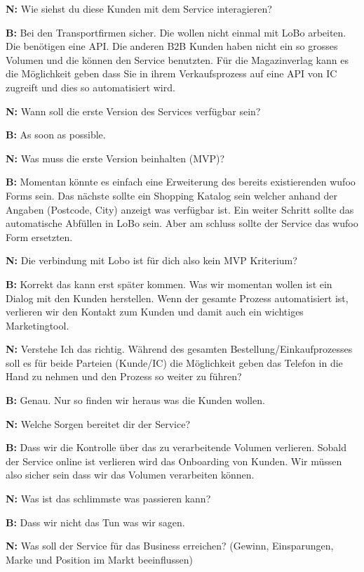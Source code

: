\textbf{N:} Wie siehst du diese Kunden mit dem Service interagieren?

\textbf{B:} Bei den Transportfirmen sicher. Die wollen nicht einmal mit LoBo arbeiten. Die benötigen eine API. Die anderen B2B Kunden haben nicht ein so grosses Volumen und die können den Service benutzten. Für die Magazinverlag kann es die Möglichkeit geben dass Sie in ihrem Verkaufsprozess auf eine API von IC zugreift und dies so automatisiert wird.

\textbf{N:} Wann soll die erste Version des Services verfügbar sein?

\textbf{B:} As soon as possible.

\textbf{N:} Was muss die erste Version beinhalten (MVP)?

\textbf{B:} Momentan könnte es einfach eine Erweiterung des bereits existierenden wufoo Forms sein. Das nächste sollte ein Shopping Katalog sein welcher anhand der Angaben (Postcode, City) anzeigt was verfügbar ist. Ein weiter Schritt sollte das automatische Abfüllen in LoBo sein. Aber am schluss sollte der Service das wufoo Form ersetzten.

\textbf{N:} Die verbindung mit Lobo ist für dich also kein MVP Kriterium?

\textbf{B:} Korrekt das kann erst später kommen. Was wir momentan wollen ist ein Dialog mit den Kunden herstellen. Wenn der gesamte Prozess automatisiert ist, verlieren wir den Kontakt zum Kunden und damit auch ein wichtiges Marketingtool.

\textbf{N:} Verstehe Ich das richtig. Während des gesamten Bestellung/Einkaufprozesses soll es für beide Parteien (Kunde/IC) die Möglichkeit geben das Telefon in die Hand zu nehmen und den Prozess so weiter zu führen?

\textbf{B:} Genau. Nur so finden wir heraus was die Kunden wollen.

\textbf{N:} Welche Sorgen bereitet dir der Service?

\textbf{B:} Dass wir die Kontrolle über das zu verarbeitende Volumen verlieren. Sobald der Service online ist verlieren wird das Onboarding von Kunden. Wir müssen also sicher sein dass wir das Volumen verarbeiten können.

\textbf{N:} Was ist das schlimmste was passieren kann?

\textbf{B:} Dass wir nicht das Tun was wir sagen.


\textbf{N:} Was soll der Service für das Business erreichen?
  (Gewinn, Einsparungen, Marke und Position im Markt beeinflussen)


